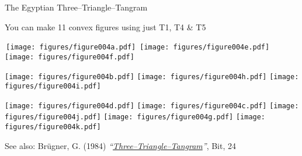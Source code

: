 \documentclass[14pt]{beamer}
\begin{document}
    \begin{frame}{The Egyptian Three--Triangle--Tangram}
        \begin{center}
            You can make 11 convex figures using just T1, T4 \& T5

            \bigskip \bigskip

            \;\,\texttt{[image: figures/figure004a.pdf]}\,\;\qquad
            \texttt{[image: figures/figure004e.pdf]}\qquad
            \texttt{[image: figures/figure004f.pdf]}\\

            \bigskip\medskip

            \;\;\texttt{[image: figures/figure004b.pdf]}\qquad
            \texttt{[image: figures/figure004h.pdf]}\qquad
            \texttt{[image: figures/figure004i.pdf]}\\

            \bigskip\smallskip

            \texttt{[image: figures/figure004d.pdf]}\quad
            \texttt{[image: figures/figure004c.pdf]}
            \texttt{[image: figures/figure004j.pdf]}\!\!
            \texttt{[image: figures/figure004g.pdf]}\quad
            \texttt{[image: figures/figure004k.pdf]}\\

            \bigskip\medskip

            {\footnotesize See also: Brügner, G. (1984) \emph{``\href{https://doi.org/10.1007/BF02136037}{Three--Triangle--Tangram}''}, Bit, 24}
        \end{center}
    \end{frame}

\end{document}
